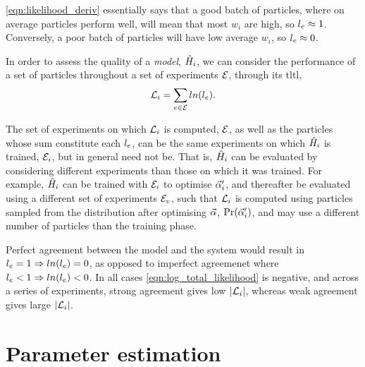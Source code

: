 \cref{eqn:likelihood_deriv} essentially says that a good batch of \glspl{particle}, 
    where on average \glspl{particle} perform well, 
    will mean that most $w_i$ are high, so $l_{e} \approx 1$. 
Conversely, a poor batch of \glspl{particle} will have low average $w_i$, so $l_{e} \approx 0$. 
\par

In order to assess the quality of a \emph{model}, $\hat{H}_i$, 
    we can consider the performance of a set of \glspl{particle} throughout a set of \glspl{experiment} ${ \mathcal{E} }$, 
    through its \gls{tltl}, 
\begin{equation}
    \label{eqn:log_total_likelihood}
    {\mathcal{L}}_{i} = \sum\limits_{e \in { \mathcal{E} }} ln(l_{e}).    
\end{equation}

The set of \glspl{experiment} on which ${\mathcal{L}}_{i}$ is computed, ${ \mathcal{E} }$, 
    as well as the \glspl{particle} whose sum constitute each $l_{e}$,
    can be the same \glspl{experiment} on which $\hat{H}_i$ is trained, ${ \mathcal{E} }_i$, but in general need not be.
That is, $\hat{H}_i$ can be evaluated by considering different \glspl{experiment} than those on which it was trained.
For example, $\hat{H}_i$ can be trained with ${ \mathcal{E} }_i$ to optimise $\vec{\alpha}_i^{\prime}$, 
    and thereafter be evaluated using a different set of \glspl{experiment} ${ \mathcal{E} }_v$, 
    such that ${\mathcal{L}}_{i}$ is computed using \glspl{particle} sampled from the distribution after optimising $\vec{\alpha}$, 
    $\Pr(\vec{\alpha}_i^{\prime})$, and may use a different number of \glspl{particle} than the training phase. 
\par 

Perfect agreement between the model and the system would result in $l_{e}=1 \Rightarrow ln(l_{e})=0$, 
    as opposed to imperfect agreemenet where $l_{e} < 1 \Rightarrow ln(l_{e}) < 0$.
In all cases \cref{eqn:log_total_likelihood} is negative, 
    and across a series of \glspl{experiment},
    strong agreement gives low $\lvert {\mathcal{L}}_{i} \rvert $, 
    whereas weak agreement gives large $\lvert {\mathcal{L}}_{i} \rvert $. 


\section{Parameter estimation}

